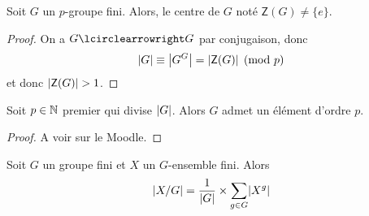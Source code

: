 \begin{corollary}
    Soit \(G\) un \(p\)-groupe fini. Alors, le centre de \(G\)
    noté \(\mathsf{Z}(G) \neq \{e\}\).
\end{corollary}

\begin{proof}
    On a \(G\act G\) par conjugaison, donc
    \begin{equation*}
        \mathopen{}\left|G\right|\mathclose{} \equiv \mathopen{}\left|G^G\right|\mathclose{} = \mathopen{}\left|\mathsf{Z}(G)\right|\mathclose{} \pmod p
    \end{equation*}
    et donc \(\mathopen{}\left|\mathsf{Z}(G)\right|\mathclose{} > 1\).
\end{proof}

\begin{theorem}[de Cauchy]
    Soit \(p\in\mathbb{N}\) premier qui divise \(\mathopen{}\left|G\right|\mathclose{}\). Alors
    \(G\) admet un élément d'ordre \(p\).
\end{theorem}

\begin{proof}
    A voir sur le Moodle.
\end{proof}

\begin{lemma}[de Burnside]
    Soit \(G\) un groupe fini et \(X\) un \(G\)-ensemble fini.
    Alors
    \begin{equation*}
        \mathopen{}\left|X/G\right|\mathclose{} = \frac{1}{\mathopen{}\left|G\right|\mathclose{}}\times \sum_{g\in G}\mathopen{}\left|X^g\right|\mathclose{}
    \end{equation*}
\end{lemma}













